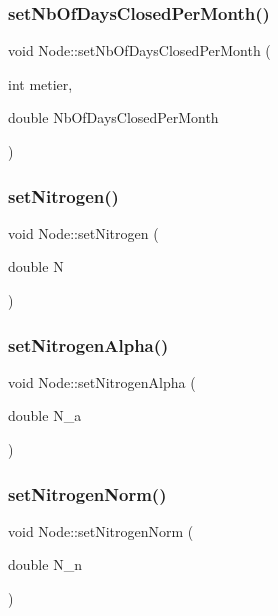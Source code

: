 \subsubsection{\texorpdfstring{setNbOfDaysClosedPerMonth()}{setNbOfDaysClosedPerMonth()}}
{\footnotesize\ttfamily void Node\+::set\+Nb\+Of\+Days\+Closed\+Per\+Month (\begin{DoxyParamCaption}\item[{int}]{metier,  }\item[{double}]{Nb\+Of\+Days\+Closed\+Per\+Month }\end{DoxyParamCaption})\hspace{0.3cm}{\ttfamily [inline]}}

\mbox{\label{class_node_a7f9261a53758ad31390252390a4ce4f3}} 
\subsubsection{\texorpdfstring{setNitrogen()}{setNitrogen()}}
{\footnotesize\ttfamily void Node\+::set\+Nitrogen (\begin{DoxyParamCaption}\item[{double}]{N }\end{DoxyParamCaption})\hspace{0.3cm}{\ttfamily [inline]}}

\mbox{\label{class_node_a3a03387e4912203d4c0188b610f0128d}} 
\subsubsection{\texorpdfstring{setNitrogenAlpha()}{setNitrogenAlpha()}}
{\footnotesize\ttfamily void Node\+::set\+Nitrogen\+Alpha (\begin{DoxyParamCaption}\item[{double}]{N\+\_\+a }\end{DoxyParamCaption})\hspace{0.3cm}{\ttfamily [inline]}}

\mbox{\label{class_node_a304aa1ab371323cd546c8eb6f3ce6bfa}} 
\subsubsection{\texorpdfstring{setNitrogenNorm()}{setNitrogenNorm()}}
{\footnotesize\ttfamily void Node\+::set\+Nitrogen\+Norm (\begin{DoxyParamCaption}\item[{double}]{N\+\_\+n }\end{DoxyParamCaption})\hspace{0.3cm}{\ttfamily [inline]}}

